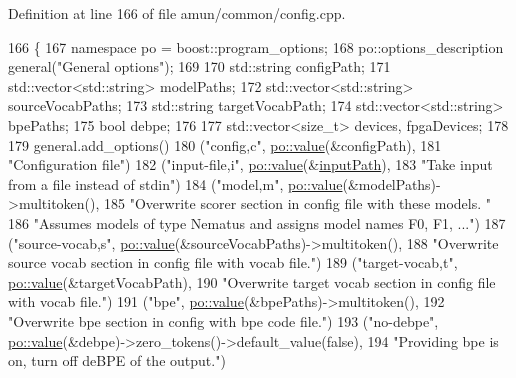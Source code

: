 Definition at line 166 of file amun/common/config.\+cpp.


\begin{DoxyCode}
166                                                 \{
167   \textcolor{keyword}{namespace }po = boost::program\_options;
168   po::options\_description general(\textcolor{stringliteral}{"General options"});
169 
170   std::string configPath;
171   std::vector<std::string> modelPaths;
172   std::vector<std::string> sourceVocabPaths;
173   std::string targetVocabPath;
174   std::vector<std::string> bpePaths;
175   \textcolor{keywordtype}{bool} debpe;
176 
177   std::vector<size\_t> devices, fpgaDevices;
178 
179   general.add\_options()
180     (\textcolor{stringliteral}{"config,c"}, \hyperlink{namespacemarian_1_1keywords_ac70de1b4c3cf6b7080cf5086f2963fd8}{po::value}(&configPath),
181      \textcolor{stringliteral}{"Configuration file"})
182     (\textcolor{stringliteral}{"input-file,i"}, \hyperlink{namespacemarian_1_1keywords_ac70de1b4c3cf6b7080cf5086f2963fd8}{po::value}(&\hyperlink{classamunmt_1_1Config_a3e3069f6b6637092d6cfe202f1e57b25}{inputPath}),
183       \textcolor{stringliteral}{"Take input from a file instead of stdin"})
184     (\textcolor{stringliteral}{"model,m"}, \hyperlink{namespacemarian_1_1keywords_ac70de1b4c3cf6b7080cf5086f2963fd8}{po::value}(&modelPaths)->multitoken(),
185      \textcolor{stringliteral}{"Overwrite scorer section in config file with these models. "}
186      \textcolor{stringliteral}{"Assumes models of type Nematus and assigns model names F0, F1, ..."})
187     (\textcolor{stringliteral}{"source-vocab,s"}, \hyperlink{namespacemarian_1_1keywords_ac70de1b4c3cf6b7080cf5086f2963fd8}{po::value}(&sourceVocabPaths)->multitoken(),
188      \textcolor{stringliteral}{"Overwrite source vocab section in config file with vocab file."})
189     (\textcolor{stringliteral}{"target-vocab,t"}, \hyperlink{namespacemarian_1_1keywords_ac70de1b4c3cf6b7080cf5086f2963fd8}{po::value}(&targetVocabPath),
190      \textcolor{stringliteral}{"Overwrite target vocab section in config file with vocab file."})
191     (\textcolor{stringliteral}{"bpe"}, \hyperlink{namespacemarian_1_1keywords_ac70de1b4c3cf6b7080cf5086f2963fd8}{po::value}(&bpePaths)->multitoken(),
192      \textcolor{stringliteral}{"Overwrite bpe section in config with bpe code file."})
193     (\textcolor{stringliteral}{"no-debpe"}, \hyperlink{namespacemarian_1_1keywords_ac70de1b4c3cf6b7080cf5086f2963fd8}{po::value}(&debpe)->zero\_tokens()->default\_value(\textcolor{keyword}{false}),
194      \textcolor{stringliteral}{"Providing bpe is on, turn off deBPE of the output."})

\end{DoxyCode}
